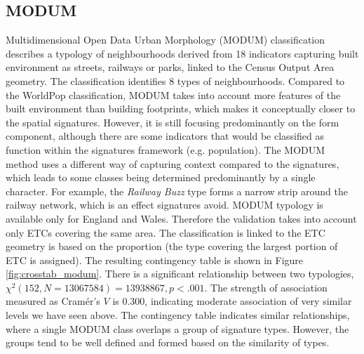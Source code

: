 \subsection*{MODUM}
Multidimensional Open Data Urban Morphology (MODUM) classification describes a typology
of neighbourhoods derived from 18 indicators capturing built environment as streets,
railways or parks, linked to the Census Output Area geometry. The classification
identifies 8 types of neighbourhoods.
Compared to the WorldPop classification, MODUM takes into account more features of
the built environment than building footprints, which makes it conceptually closer to the
spatial signatures. However, it is still focusing predominantly on the form component,
although there are some indicators that would be classified as function within the
signatures framework (e.g. population). The MODUM method uses a different way of
capturing context compared to the signatures, which leads to some classes being
determined predominantly by a single character. For example, the \textit{Railway Buzz} type
forms a narrow strip around the railway network, which is an effect signatures avoid.
MODUM typology is available only for England and Wales. Therefore the validation takes
into account only ETCs covering the same area. The classification is linked to the
ETC geometry is based on the proportion (the type covering the largest portion of ETC is
assigned). The resulting contingency table is shown in Figure \ref{fig:crosstab_modum}. There is a
significant relationship between two typologies, $\chi^{2} (152, N = 13067584) =
13938867, p < .001$. The strength of association measured as Cramér's $V$ is $0.300$,
indicating moderate association of very similar levels we have seen above. The
contingency table indicates similar relationships, where a single MODUM class overlaps a
group of signature types. However, the groups tend to be well defined and formed based
on the similarity of types.

